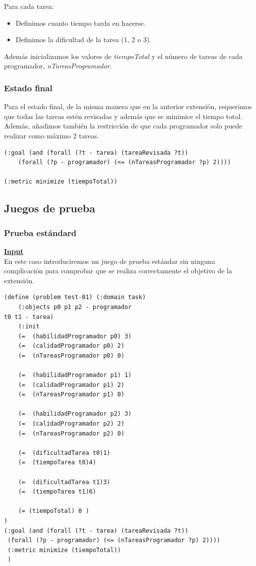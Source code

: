 \documentclass[11pt]{article}
\begin{document}
\noindent Para cada tarea:
\begin{itemize}
  	\item Definimos cuanto tiempo tarda en hacerse.
  	\item Definimos la dificultad de la tarea (1, 2 o 3).
\end{itemize}

\noindent Además inicializamos los valores de \textit{tiempoTotal} y el número de tareas de cada programador, \textit{nTareasProgramador}. 

\subsubsection{Estado final}
Para el estado final, de la misma manera que en la anterior extensión, requerimos que todas las tareas estén revisadas y además que se minimice el tiempo total. Además, añadimos también la restricción de que cada programador solo puede realizar como máximo 2 tareas. 

\begin{verbatim}
(:goal (and (forall (?t - tarea) (tareaRevisada ?t))
	(forall (?p - programador) (<= (nTareasProgramador ?p) 2))))

(:metric minimize (tiempoTotal))
\end{verbatim}
\subsection{Juegos de prueba}
\subsubsection{Prueba estándard}
\underline{\textbf{Input}}\\

En este caso introduciremos un juego de prueba estándar sin ninguna complicación para comprobar que se realiza correctamente el objetivo de la extensión. 
\begin{verbatim}
(define (problem test-01) (:domain task) 
	(:objects p0 p1 p2 - programador
t0 t1 - tarea)
	(:init
	(=  (habilidadProgramador p0) 3)
	(=  (calidadProgramador p0) 2)
	(=  (nTareasProgramador p0) 0)

	(=  (habilidadProgramador p1) 1)
	(=  (calidadProgramador p1) 2)
	(=  (nTareasProgramador p1) 0)

	(=  (habilidadProgramador p2) 3)
	(=  (calidadProgramador p2) 2)
	(=  (nTareasProgramador p2) 0)

	(=  (dificultadTarea t0)1)
	(=  (tiempoTarea t0)4)

	(=  (dificultadTarea t1)3)
	(=  (tiempoTarea t1)6)

	(= (tiempoTotal) 0 )
)
(:goal (and (forall (?t - tarea) (tareaRevisada ?t))
 (forall (?p - programador) (<= (nTareasProgramador ?p) 2))))
 (:metric minimize (tiempoTotal))
 )
 \end{verbatim}
 \medskip
\end{document}
